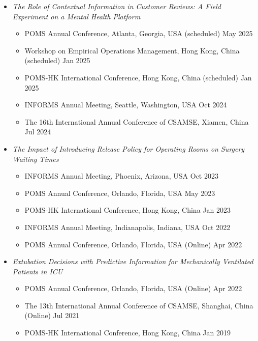 \documentclass[12pt, a4paper]{article}
\begin{document}
{\begin{itemize}[leftmargin=14pt]

	\item[] {\it The Role of Contextual Information in Customer Reviews: A Field Experiment on a Mental Health Platform}
	\begin{itemize}[label=$\bullet$]
		\item POMS Annual Conference, Atlanta, Georgia, USA (scheduled) \hfill May 2025
		\item Workshop on Empirical Operations Management, Hong Kong, China (scheduled) \hfill Jan 2025
		\item POMS-HK International Conference, Hong Kong, China (scheduled) \hfill Jan 2025
		\item INFORMS Annual Meeting, Seattle, Washington, USA \hfill Oct 2024
		\item The 16th International Annual Conference of CSAMSE, Xiamen, China \hfill Jul 2024
	\end{itemize}

	\item[] {\it The Impact of Introducing Release Policy for Operating Rooms on Surgery Waiting Times}
	\begin{itemize}[label=$\bullet$]
		\item INFORMS Annual Meeting, Phoenix, Arizona, USA \hfill Oct 2023
		\item POMS Annual Conference, Orlando, Florida, USA \hfill May 2023
		\item POMS-HK International Conference, Hong Kong, China \hfill Jan 2023
		\item INFORMS Annual Meeting, Indianapolis, Indiana, USA \hfill Oct 2022
		\item POMS Annual Conference, Orlando, Florida, USA (Online) \hfill Apr 2022
	\end{itemize}

	\item[] {\it Extubation Decisions with Predictive Information for Mechanically Ventilated Patients in ICU}
	\begin{itemize}[label=$\bullet$]
		\item POMS Annual Conference, Orlando, Florida, USA (Online) \hfill Apr 2022
		\item The 13th International Annual Conference of CSAMSE, Shanghai, China (Online) \hfill Jul 2021
		\item POMS-HK International Conference, Hong Kong, China \hfill Jan 2019
	\end{itemize}


\end{itemize}}
\end{document}
